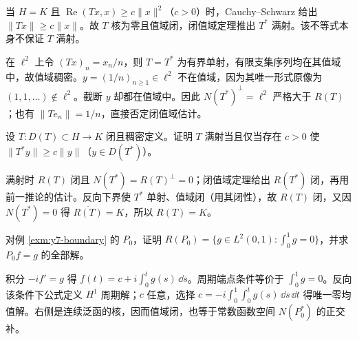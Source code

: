当 $H=K$ 且 $\operatorname{Re}(Tx,x)\ge c\|x\|^2$（$c>0$）时，Cauchy--Schwarz 给出 $\|Tx\|\ge c\|x\|$。故 $T$ 核为零且值域闭，闭值域定理推出 $T^*$ 满射。该不等式本身不保证 $T$ 满射。

\begin{example}[稠密值域却不闭]
在 $\ell^2$ 上令 $(Tx)_n=x_n/n$，则 $T=T^*$ 为有界单射，有限支集序列均在其值域中，故值域稠密。$y=(1/n)_{n\ge1}\in\ell^2$ 不在值域，因为其唯一形式原像为 $(1,1,\ldots)\notin\ell^2$。截断 $y$ 却都在值域中。因此 $N(T^*)^\perp=\ell^2$ 严格大于 $R(T)$；也有 $\|Te_n\|=1/n$，直接否定闭值域估计。
\end{example}

\begin{exercise}[满射与下界]\label{ex:y7-surjectivity}
设 $T:D(T)\subset H\to K$ 闭且稠密定义。证明 $T$ 满射当且仅当存在 $c>0$ 使 $\|T^*y\|\ge c\|y\|$（$y\in D(T^*)$）。
\end{exercise}
\begin{solution}
满射时 $R(T)$ 闭且 $N(T^*)=R(T)^\perp=0$；闭值域定理给出 $R(T^*)$ 闭，再用前一推论的估计。反向下界使 $T^*$ 单射、值域闭（用其闭性），故 $R(T)$ 闭，又因 $N(T^*)=0$ 得 $\overline{R(T)}=K$，所以 $R(T)=K$。
\end{solution}

\begin{exercise}[周期微分方程的相容条件]\label{ex:y7-periodic}
对例 \ref{exm:y7-boundary} 的 $P_0$，证明 $R(P_0)=\{g\in L^2(0,1):\int_0^1g=0\}$，并求 $P_0f=g$ 的全部解。
\end{exercise}
\begin{solution}
积分 $-if'=g$ 得 $f(t)=c+i\int_0^tg(s)\,\dd s$。周期端点条件等价于 $\int_0^1g=0$。反向该条件下公式定义 $H^1$ 周期解；$c$ 任意，选择 $c=-i\int_0^1\int_0^tg(s)\,\dd s\,\dd t$ 得唯一零均值解。右侧是连续泛函的核，因而值域闭，也等于常数函数空间 $N(P_0^*)$ 的正交补。
\end{solution}
